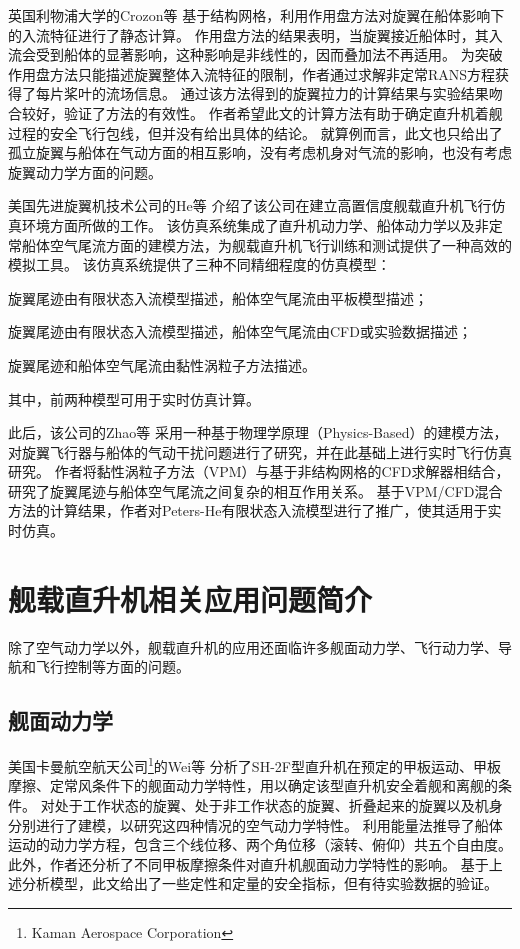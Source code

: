 \documentclass[doctor,openright,twoside,color]{buaathesis}
\begin{document}
英国利物浦大学的Crozon等
基于结构网格，利用作用盘方法对旋翼在船体影响下的入流特征进行了静态计算。
作用盘方法的结果表明，当旋翼接近船体时，其入流会受到船体的显著影响，这种影响是非线性的，因而叠加法不再适用。
为突破作用盘方法只能描述旋翼整体入流特征的限制，作者通过求解非定常RANS方程获得了每片桨叶的流场信息。
通过该方法得到的旋翼拉力的计算结果与实验结果吻合较好，验证了方法的有效性。
作者希望此文的计算方法有助于确定直升机着舰过程的安全飞行包线，但并没有给出具体的结论。
就算例而言，此文也只给出了孤立旋翼与船体在气动方面的相互影响，没有考虑机身对气流的影响，也没有考虑旋翼动力学方面的问题。

美国先进旋翼机技术公司的He等
介绍了该公司在建立高置信度舰载直升机飞行仿真环境方面所做的工作。
该仿真系统集成了直升机动力学、船体动力学以及非定常船体空气尾流方面的建模方法，为舰载直升机飞行训练和测试提供了一种高效的模拟工具。
该仿真系统提供了三种不同精细程度的仿真模型：
\begin{compactitem}
  \item 旋翼尾迹由有限状态入流模型描述，船体空气尾流由平板模型描述；
  \item 旋翼尾迹由有限状态入流模型描述，船体空气尾流由CFD或实验数据描述；
  \item 旋翼尾迹和船体空气尾流由黏性涡粒子方法描述。
\end{compactitem}
其中，前两种模型可用于实时仿真计算。

此后，该公司的Zhao等
采用一种基于物理学原理（Physics-Based）的建模方法，对旋翼飞行器与船体的气动干扰问题进行了研究，并在此基础上进行实时飞行仿真研究。
作者将黏性涡粒子方法（VPM）与基于非结构网格的CFD求解器相结合，研究了旋翼尾迹与船体空气尾流之间复杂的相互作用关系。
基于VPM/CFD混合方法的计算结果，作者对Peters-He有限状态入流模型进行了推广，使其适用于实时仿真。

\section{舰载直升机相关应用问题简介}
除了空气动力学以外，舰载直升机的应用还面临许多舰面动力学、飞行动力学、导航和飞行控制等方面的问题。

\subsection{舰面动力学}
美国卡曼航空航天公司\footnote{Kaman Aerospace Corporation}的Wei等
分析了SH-2F型直升机在预定的甲板运动、甲板摩擦、定常风条件下的舰面动力学特性，用以确定该型直升机安全着舰和离舰的条件。
对处于工作状态的旋翼、处于非工作状态的旋翼、折叠起来的旋翼以及机身分别进行了建模，以研究这四种情况的空气动力学特性。
利用能量法推导了船体运动的动力学方程，包含三个线位移、两个角位移（滚转、俯仰）共五个自由度。
此外，作者还分析了不同甲板摩擦条件对直升机舰面动力学特性的影响。
基于上述分析模型，此文给出了一些定性和定量的安全指标，但有待实验数据的验证。
\end{document}

